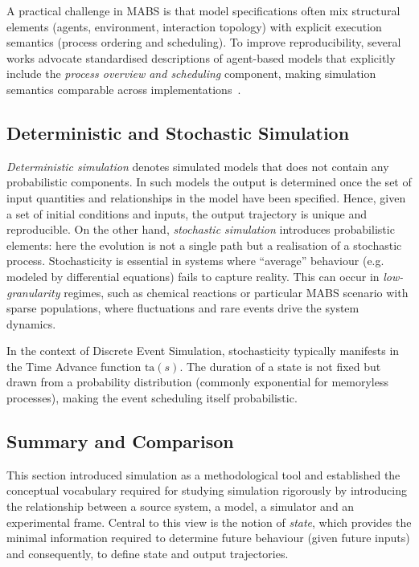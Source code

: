 A practical challenge in \ac{MABS} is that model specifications often mix
structural elements (agents, environment, interaction topology) with explicit
execution semantics (process ordering and scheduling). To improve
reproducibility, several works advocate standardised descriptions of
agent-based models that explicitly include the \emph{process overview and
	scheduling} component, making simulation semantics comparable across
implementations~\cite{GRIMM2006115}.

\subsection{Deterministic and Stochastic Simulation}\label{ssec:det_stoch_sim}
\emph{Deterministic simulation} denotes simulated models that does not contain
any probabilistic components. In such models the output is determined once the
set of input quantities and relationships in the model have been specified.
Hence, given a set of initial conditions and inputs, the output trajectory is
unique and reproducible. On the other hand, \emph{stochastic simulation}
introduces probabilistic elements: here the evolution is not a single path but
a realisation of a stochastic process. Stochasticity is essential in systems
where ``average'' behaviour (e.g. modeled by differential equations) fails to
capture reality. This can occur in \emph{low-granularity} regimes, such as
chemical reactions or particular \ac{MABS} scenario with sparse populations,
where fluctuations and rare events drive the system dynamics.

In the context of Discrete Event Simulation, stochasticity typically manifests
in the Time Advance function $\text{ta}(s)$. The duration of a state is not
fixed but drawn from a probability distribution (commonly exponential for
memoryless processes), making the event scheduling itself probabilistic.

\subsection{Summary and Comparison}

This section introduced simulation as a methodological tool and established the
conceptual vocabulary required for studying simulation rigorously by
introducing the relationship between a source system, a model, a simulator and
an experimental frame. Central to this view is the notion of \emph{state},
which provides the minimal information required to determine future behaviour
(given future inputs) and consequently, to define state and output
trajectories.

